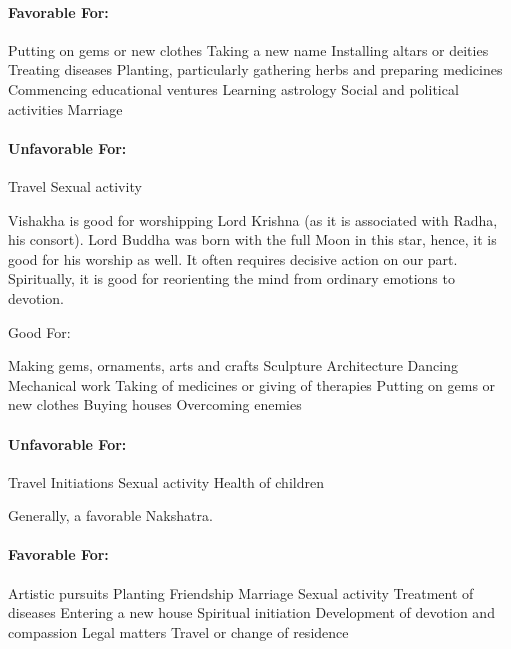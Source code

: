  

\paragraph{Favorable For:}

Putting on gems or new clothes
Taking a new name
Installing altars or deities
Treating diseases
Planting, particularly gathering herbs and preparing medicines
Commencing educational ventures
Learning astrology
Social and political activities
Marriage
 

\paragraph{Unfavorable For:}

Travel
Sexual activity
 


Vishakha is good for worshipping Lord Krishna (as it is associated with Radha, his consort). Lord Buddha was born with the full Moon in this star, hence, it is good for his worship as well. It often requires decisive action on our part. Spiritually, it is good for reorienting the mind from ordinary emotions to devotion.

 

Good For:

Making gems, ornaments, arts and crafts
Sculpture
Architecture
Dancing
Mechanical work
Taking of medicines or giving of therapies
Putting on gems or new clothes
Buying houses
Overcoming enemies
 

\paragraph{Unfavorable For:}

Travel
Initiations
Sexual activity
Health of children
 

 


Generally, a favorable Nakshatra.

 

\paragraph{Favorable For:}

Artistic pursuits
Planting
Friendship
Marriage
Sexual activity
Treatment of diseases
Entering a new house
Spiritual initiation
Development of devotion and compassion
Legal matters
Travel or change of residence
 

